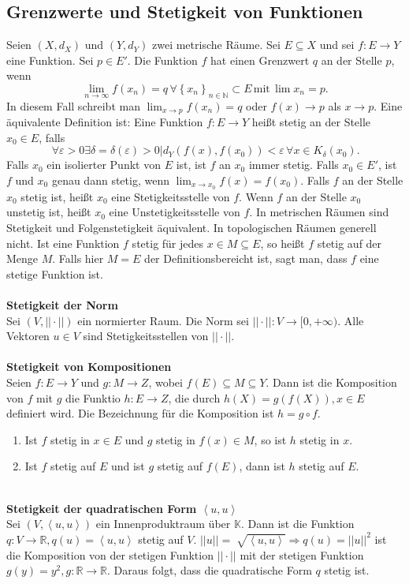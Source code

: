 \documentclass[a4paper,12pt]{article}
\begin{document}
\subsection{Grenzwerte und Stetigkeit von Funktionen}
Seien $(X,d_X)$ und $(Y,d_Y)$ zwei metrische Räume. Sei $E\subseteq X$ und sei $f:E\rightarrow Y$ eine Funktion. Sei $p \in E'$. Die Funktion $f$ hat einen Grenzwert $q$ an der Stelle $p$, wenn
\[ 
        \lim_{n\rightarrow \infty}f(x_n)=q\,\forall \left\{x_n\right\}_{n  \in \mathbb{N}}\subset E\,\text{mit}\,\lim_{}x_n=p
.\] 
In diesem Fall schreibt man $\lim_{x\rightarrow p}f(x_n)=q$ oder $f(x)\rightarrow p$ als $x\rightarrow p$. Eine äquivalente Definition ist: Eine Funktion $f:E\rightarrow Y$ heißt stetig an der Stelle $x_0 \in E$, falls
\[ 
        \,\forall \varepsilon >0\exists \delta =\delta (\varepsilon )>0|d_Y(f(x),f(x_0))<\varepsilon \,\forall x \in K_\delta (x_0)
.\] 
Falls $x_0$ ein isolierter Punkt von $E$ ist, ist $f$ an $x_0$ immer stetig. Falls $x_0 \in E'$, ist $f$ und $x_0$ genau dann stetig, wenn $\lim_{x\rightarrow x_0}f(x)=f(x_0)$. Falls $f$ an der Stelle $x_0$ stetig ist, heißt $x_0$ eine Stetigkeitsstelle von $f$. Wenn $f$ an der Stelle $x_0$ unstetig ist, heißt $x_0$ eine Unstetigkeitsstelle von $f$. In metrischen Räumen sind Stetigkeit und Folgenstetigkeit äquivalent. In topologischen Räumen generell nicht.  Ist eine Funktion $f$ stetig für jedes $x \in M\subseteq E$, so heißt $f$ stetig auf der Menge $M$. Falls hier $M=E$ der Definitionsbereicht ist, sagt man, dass $f$ eine stetige Funktion ist.
\\\hfill\\\textbf{Stetigkeit der Norm}\\
Sei $(V,||\cdot ||)$ ein normierter Raum. Die Norm sei $||\cdot ||:V\rightarrow [0,+\infty)$. Alle Vektoren $u \in V$ sind Stetigkeitsstellen von $||\cdot || $. 
\\\hfill\\\textbf{Stetigkeit von Kompositionen}\\ 
Seien $f:E\rightarrow Y$ und $g:M\rightarrow Z$, wobei $f(E)\subseteq M\subseteq Y$. Dann ist die Komposition von $f$ mit $g$ die Funktio $h:E\rightarrow Z$, die durch $h(X)=g(f(X)),x \in E$ definiert wird. Die Bezeichnung für die Komposition ist $h=g\circ f$.
\begin{enumerate}[label=\arabic*.]
        \item Ist $f$ stetig in $x \in E$ und $g$ stetig in $f(x) \in M$, so ist $h$ stetig in $x$.
        \item Ist $f$ stetig auf $E$ und ist $g$ stetig auf $f(E)$, dann ist $h$ stetig auf $E$.
\end{enumerate}
\hfill\\\textbf{Stetigkeit der quadratischen Form $\left\langle u,u\right\rangle $}\\ 
Sei $(V,\left\langle u,u\right\rangle )$ ein Innenproduktraum über $\mathbb{K}$. Dann ist die Funktion $q:V\rightarrow \mathbb{R},q(u)=\left\langle u,u\right\rangle $ stetig auf $V$. $||u||=\sqrt[]{\left\langle u,u\right\rangle }\Rightarrow q(u)=||u||^2$ ist die Komposition von der stetigen Funktion $||\cdot || $ mit der stetigen Funktion $g(y)=y^2,g:\mathbb{R}\rightarrow \mathbb{R}$. Daraus folgt, dass die quadratische Form $q$ stetig ist.
\end{document}
